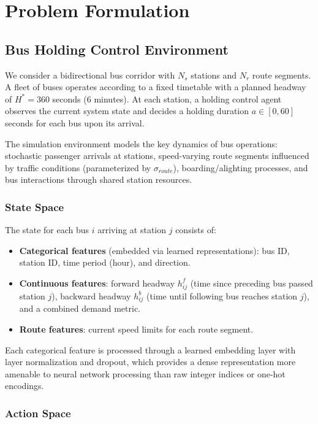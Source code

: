 \documentclass[10pt]{article}
\begin{document}
\section{Problem Formulation}
\label{sec:problem}

\subsection{Bus Holding Control Environment}

We consider a bidirectional bus corridor with $N_s$ stations and $N_r$ route segments. A fleet of buses operates according to a fixed timetable with a planned headway of $H^* = 360$ seconds (6 minutes). At each station, a holding control agent observes the current system state and decides a holding duration $a \in [0, 60]$ seconds for each bus upon its arrival.

The simulation environment models the key dynamics of bus operations: stochastic passenger arrivals at stations, speed-varying route segments influenced by traffic conditions (parameterized by $\sigma_{route}$), boarding/alighting processes, and bus interactions through shared station resources.

\subsubsection{State Space}

The state for each bus $i$ arriving at station $j$ consists of:
\begin{itemize}
    \item \textbf{Categorical features} (embedded via learned representations): bus ID, station ID, time period (hour), and direction.
    \item \textbf{Continuous features}: forward headway $h^f_{ij}$ (time since preceding bus passed station $j$), backward headway $h^b_{ij}$ (time until following bus reaches station $j$), and a combined demand metric.
    \item \textbf{Route features}: current speed limits for each route segment.
\end{itemize}

Each categorical feature is processed through a learned embedding layer with layer normalization and dropout, which provides a dense representation more amenable to neural network processing than raw integer indices or one-hot encodings.

\subsubsection{Action Space}
\end{document}
